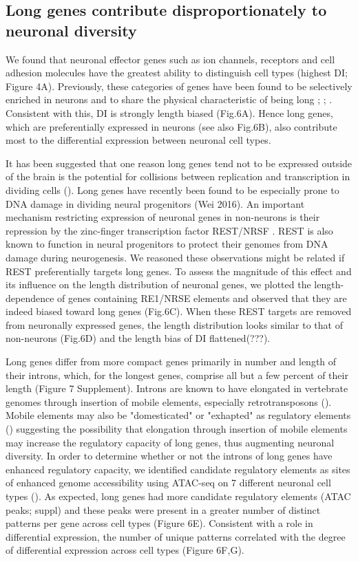 \subsection{Long genes contribute disproportionately to neuronal diversity}

We found that neuronal effector genes such as ion channels, receptors and cell adhesion molecules have the greatest ability to distinguish cell types (highest DI; Figure 4A). Previously, these categories of genes have been found to be selectively enriched in neurons and to share the physical characteristic of being long \cite{Sugino_2014}; \cite{Gabel_2015}; \cite{Zylka_2015}. Consistent with this, DI is strongly length biased (Fig.6A). Hence long genes, which are preferentially expressed in neurons (see also Fig.6B), also contribute most to the differential expression between neuronal cell types. 

It has been suggested that one reason long genes tend not to be expressed outside of the brain is the potential for collisions between replication and transcription in dividing cells (). Long genes have recently been found to be especially prone to DNA damage in dividing neural progenitors (Wei 2016). An important mechanism restricting expression of neuronal genes in non-neurons is their repression by the zinc-finger transcription factor REST/NRSF \cite{RN1}\cite{RN2a}. REST is also known to function in neural progenitors to protect their genomes from DNA damage during neurogenesis. We reasoned these observations might be related if REST preferentially targets long genes. To assess the magnitude of this effect and its influence on the length distribution of neuronal genes, we plotted the length-dependence of genes containing RE1/NRSE elements and observed that they are indeed biased toward long genes (Fig.6C). When these REST targets are removed from neuronally expressed genes, the length distribution looks similar to that of non-neurons (Fig.6D) and the length bias of DI flattened(???).

Long genes differ from more compact genes primarily in number and length of their introns, which, for the longest genes, comprise all but a few percent of their length (Figure 7 Supplement). Introns are known to have elongated in vertebrate genomes through insertion of mobile elements, especially retrotransposons (). Mobile elements may also be "domesticated" or "exhapted" as regulatory elements () suggesting the possibility that elongation through insertion of mobile elements may increase the regulatory capacity of long genes, thus augmenting neuronal diversity. In order to determine whether or not the introns of long genes have enhanced regulatory capacity, we identified candidate regulatory elements as sites of enhanced genome accessibility using ATAC-seq on 7 different neuronal cell types (). As expected, long genes had more candidate regulatory elements (ATAC peaks; suppl) and these peaks were present in a greater number of distinct patterns per gene across cell types (Figure 6E). Consistent with a role in differential expression, the number of unique patterns correlated with the degree of differential expression across cell types (Figure 6F,G).

